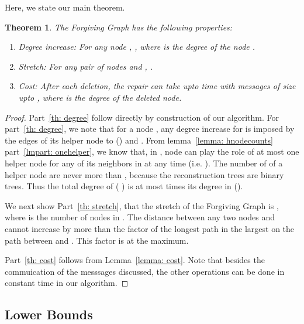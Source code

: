 \documentclass[11pt, letter]{article}
\newtheorem{theorem}{Theorem}
\begin{document}
Here, we state our main theorem. 
 


\begin{theorem}
 
The Forgiving Graph has the following properties:
\label{theorem: forgiving}
\begin{enumerate}
\item\label{th: degree} 
 \emph{Degree increase:} For any node , , where  is the degree of the node . 
\item\label{th: stretch} 
\emph{Stretch:} For any pair of nodes  and , .
\item \label{th: cost}  \emph{Cost:} After each deletion, the repair can take upto  time with  messages of size upto , where  is the degree of the deleted node.
\end{enumerate}
\end{theorem}

\begin{proof}
 Part~\ref{th: degree} follow directly by construction of our algorithm.  For part~\ref{th: degree}, we note that for a
node , any degree increase for  is imposed by the  edges of its helper node to () and . From lemma~\ref{lemma: hnodecounts} part~\ref{lmpart:
onehelper}, we know that, in , node  can play the role of at most one helper node for any of its neighbors in
 at  any time (i.e.  ).
The number of  of a helper node are never more than , because the reconstruction trees are binary trees. 
Thus the total degree of  ( ) is at most  times its degree in  (). 



We next show Part~\ref{th: stretch}, that the stretch of the Forgiving Graph is  , where  is the number
of nodes in . The distance between any two nodes  and  cannot increase by more than the factor of the
longest path in the largest  on the path between  and . This factor is  at the maximum.

 Part~\ref{th: cost} follows from Lemma~\ref{lemma: cost}. Note that besides the commuication of the messsages
discussed, the other operations can be done in constant time in our algorithm.
 
\end{proof}

\pagebreak

\subsection{Lower Bounds}
\end{document}
